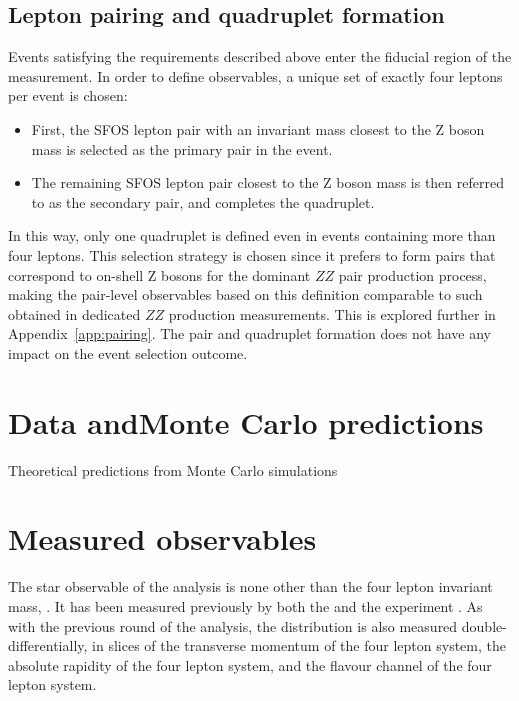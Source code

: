 
\subsection*{Lepton pairing and quadruplet formation} 
Events satisfying the requirements described above enter the fiducial region of the measurement. 
In order to define observables, a unique set of exactly four leptons per event is chosen: 
\begin{itemize}
\item First, the SFOS lepton pair with an invariant mass closest to the Z boson mass is selected as the primary pair in the event. 
\item The remaining SFOS lepton pair closest to the Z boson mass is then referred to as the secondary pair, and completes the quadruplet. 
\end{itemize}
In this way, only one quadruplet is defined even in events containing more than four leptons.
This selection strategy is chosen since it prefers to form pairs that correspond to on-shell Z bosons for the dominant $ZZ$ pair production process, making the pair-level observables based on this definition comparable to such obtained in dedicated $ZZ$ production measurements. This is explored further in Appendix~\ref{app:pairing}. 
The pair and quadruplet formation does not have any impact on the event selection outcome. 

\section{Data andMonte Carlo predictions}
\label{sec:montecarlo}

Theoretical predictions from Monte Carlo simulations

\section{Measured observables}

The star observable of the analysis is none other than the four lepton invariant mass, \mFourL. It has been measured previously by both the \ATLAS and the \CMS experiment  \cite{}. As with the previous round of the analysis, the \mFourL distribution is also measured double-differentially, in slices of the transverse momentum of the four lepton system, the absolute rapidity of the four lepton system, and the flavour channel of the four lepton system. 

